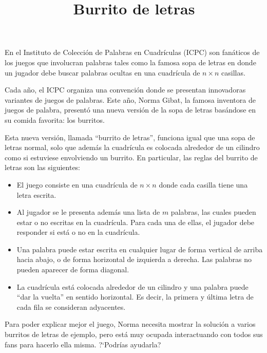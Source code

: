 \documentclass{oci}
\title{Burrito de letras}
\begin{document}
\begin{problemDescription}
  En el Instituto de Colección de Palabras en Cuadrículas (ICPC) son fanáticos
  de los juegos que involucran palabras tales como la famosa sopa de letras
  en donde un jugador debe buscar palabras ocultas en una cuadrícula de $n \times n$
  casillas.

  Cada año, el ICPC organiza una convención donde se presentan
  innovadoras variantes de juegos de palabras.
  Este año, Norma Gibat, la famosa inventora de juegos de palabra,
  presentó una nueva versión de la sopa de letras basándose en su
  comida favorita: los burritos.

  Esta nueva versión, llamada ``burrito de letras'', funciona igual
  que una sopa de letras normal, solo que además la cuadrícula es
  colocada alrededor de un cilindro como si estuviese envolviendo
  un burrito.
  En particular, las reglas del burrito de letras son las siguientes:
  \begin{itemize}
    \item El juego consiste en una cuadrícula de $n \times n$ donde cada casilla tiene una letra
      escrita.
    \item Al jugador se le presenta además una lista de $m$ palabras, las cuales
      pueden estar o no escritas en la cuadrícula.
      Para cada una de ellas, el jugador debe responder
      si está o no en la cuadrícula.
    \item Una palabra puede estar escrita en cualquier lugar de forma vertical de arriba hacia abajo,
      o de forma horizontal de izquierda a derecha.
      Las palabras no pueden aparecer de forma diagonal.
    \item La cuadrícula está colocada alrededor de un cilindro y una palabra puede
      ``dar la vuelta'' en sentido horizontal.
      Es decir, la primera y última letra de cada fila se consideran adyacentes.
  \end{itemize}

  Para poder explicar mejor el juego, Norma necesita mostrar la
  solución a varios burritos de letras de ejemplo, pero está muy
  ocupada interactuando con todos sus fans para hacerlo ella misma.
  ?`Podrías ayudarla?


\end{problemDescription}
\end{document}
